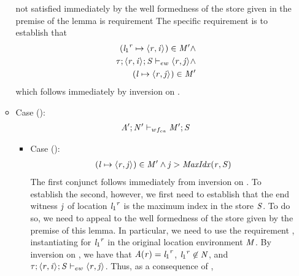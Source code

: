 \begin{nproof}
\begin{bcase}
\begin{itemize}
\begin{itemize}
      not satisfied immediately by the well formedness of the store
      given in the premise of the lemma is requirement
      The specific requirement is to establish that
      \begin{align*}
       ({\mathit{l}_1}^{\mathit{r}} \mapsto \langle \mathit{r}, \mathit{i} \rangle ^{}) \in \mathit{M}' \wedge \\
       \mathit{\tau};\langle \mathit{r}, \mathit{i} \rangle ^{};\mathit{S} \vdash_{ew} \langle \mathit{r}, \mathit{j} \rangle ^{} \wedge \\
       (\mathit{l} \mapsto \langle \mathit{r}, \mathit{j} \rangle ^{}) \in \mathit{M}'
      \end{align*}
      which follows immediately by inversion on \dletlocafter{}.
      \item Case ():
      \begin{align*}
      \mathit{A}';\mathit{N}' \vdash_{wf_{ca}} \mathit{M}';\mathit{S}
      \end{align*}
        \begin{itemize}
        \item Case ():
        \begin{align*}
                  (\mathit{l} \mapsto \langle \mathit{r}, \mathit{j} \rangle ^{}) \in \mathit{M}' \wedge
          \mathit{j} > \mathit{MaxIdx}(\mathit{r},\mathit{S})
        \end{align*}
        The first conjunct follows immediately from inversion on \dletlocafter{}.
        To establish the second, however, we first need to establish
        that the end witness $\mathit{j}$ of location ${\mathit{l}_1}^{\mathit{r}}$ is the maximum index in the
        store $\mathit{S}$.
        To do so, we need to appeal to the well formedness of the store given by the
        premise of this lemma.
        In particular, we need to use the requirement ,
        instantiating for ${\mathit{l}_1}^{\mathit{r}}$ in the original location environment $\mathit{M}$.
        By inversion on \tllafter{}, we have that $\mathit{A}(\mathit{r}) = {\mathit{l}_1}^{\mathit{r}}$, ${\mathit{l}_1}^{\mathit{r}} \not \in \mathit{N}$,
        and $\mathit{\tau};\langle \mathit{r}, \mathit{i} \rangle ^{};\mathit{S} \vdash_{ew} \langle \mathit{r}, \mathit{j} \rangle ^{}$.
        Thus, as a consequence of ,

\end{itemize}
\end{itemize}
\end{itemize}
\end{bcase}
\end{nproof}
